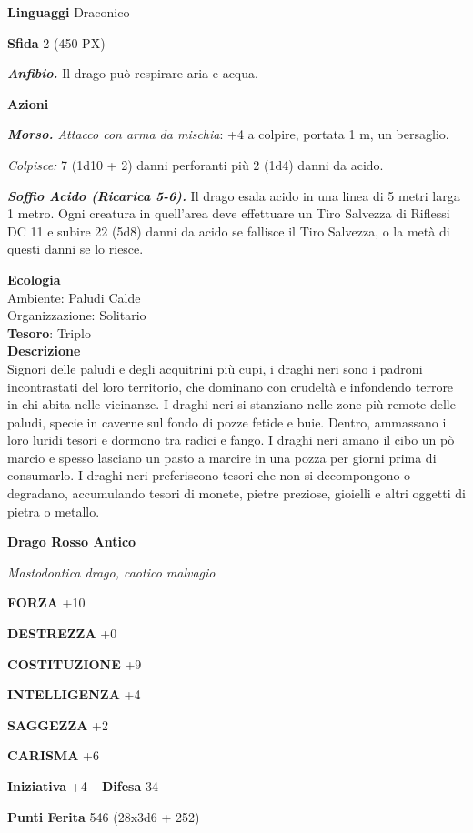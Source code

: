 \begin{multicols}{2}
	\textbf{Linguaggi} Draconico

	\textbf{Sfida} 2 (450 PX)

	\textit{\textbf{Anfibio.}} Il drago può respirare aria e acqua.

	\textbf{Azioni}

	\textit{\textbf{Morso.} Attacco con arma da mischia}: +4 a colpire, portata 1 m, un bersaglio.

	\textit{Colpisce:} 7 (1d10 + 2) danni perforanti più 2 (1d4) danni da acido.

	\textit{\textbf{Soffio Acido (Ricarica 5-6).}} Il drago esala acido in una linea di 5 metri larga 1 metro. Ogni creatura in quell'area deve effettuare un Tiro Salvezza di Riflessi DC 11 e subire 22 (5d8) danni da acido se fallisce il Tiro Salvezza, o la metà di questi danni se lo riesce.

	\textbf{Ecologia}\\
	Ambiente: Paludi Calde\\
	Organizzazione: Solitario\\
	\textbf{Tesoro}: Triplo\\
	\textbf{Descrizione}\\
	Signori delle paludi e degli acquitrini più cupi, i draghi neri sono i padroni incontrastati del loro territorio, che dominano con crudeltà e infondendo terrore in chi abita nelle vicinanze. I draghi neri si stanziano nelle zone più remote delle paludi, specie in caverne sul fondo di pozze fetide e buie. Dentro, ammassano i loro luridi tesori e dormono tra radici e fango. I draghi neri amano il cibo un pò marcio e spesso lasciano un pasto a marcire in una pozza per giorni prima di consumarlo. I draghi neri preferiscono tesori che non si decompongono o degradano, accumulando tesori di monete, pietre preziose, gioielli e altri oggetti di pietra o metallo.

	\medskip{}\textbf{Drago Rosso Antico}

	\textit{Mastodontica drago, caotico malvagio}

	\textbf{FORZA} +10

	\textbf{DESTREZZA} +0

	\textbf{COSTITUZIONE} +9

	\textbf{INTELLIGENZA} +4

	\textbf{SAGGEZZA} +2

	\textbf{CARISMA} +6

	\textbf{Iniziativa} +4 -- \textbf{Difesa} 34

	\textbf{Punti Ferita} 546 (28x3d6 + 252)


\end{multicols}
